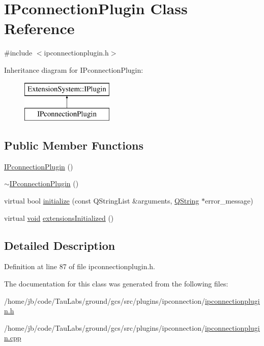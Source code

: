 \hypertarget{class_i_pconnection_plugin}{\section{\-I\-Pconnection\-Plugin \-Class \-Reference}
\label{class_i_pconnection_plugin}
}


{\ttfamily \#include $<$ipconnectionplugin.\-h$>$}

\-Inheritance diagram for \-I\-Pconnection\-Plugin\-:\begin{figure}[H]
\begin{center}
\leavevmode
\includegraphics[height=2.000000cm]{class_i_pconnection_plugin}
\end{center}
\end{figure}
\subsection*{\-Public \-Member \-Functions}
\begin{DoxyCompactItemize}
\item 
\hyperlink{group___i_p_conn_plugin_ga49199ecbe02c9b8fec0c2e0b1003d8ef}{\-I\-Pconnection\-Plugin} ()
\item 
\hyperlink{group___i_p_conn_plugin_gad46085821e644ad2a37cf2b6f79d0883}{$\sim$\-I\-Pconnection\-Plugin} ()
\item 
virtual bool \hyperlink{group___i_p_conn_plugin_ga66ca8127b859071b5c905aa9d0c22c55}{initialize} (const \-Q\-String\-List \&arguments, \hyperlink{group___u_a_v_objects_plugin_gab9d252f49c333c94a72f97ce3105a32d}{\-Q\-String} $\ast$error\-\_\-message)
\item 
virtual \hyperlink{group___u_a_v_objects_plugin_ga444cf2ff3f0ecbe028adce838d373f5c}{void} \hyperlink{group___i_p_conn_plugin_ga61e1d618e2d1914fd8190687cf0017a5}{extensions\-Initialized} ()
\end{DoxyCompactItemize}


\subsection{\-Detailed \-Description}


\-Definition at line 87 of file ipconnectionplugin.\-h.



\-The documentation for this class was generated from the following files\-:\begin{DoxyCompactItemize}
\item 
/home/jb/code/\-Tau\-Labs/ground/gcs/src/plugins/ipconnection/\hyperlink{ipconnectionplugin_8h}{ipconnectionplugin.\-h}\item 
/home/jb/code/\-Tau\-Labs/ground/gcs/src/plugins/ipconnection/\hyperlink{ipconnectionplugin_8cpp}{ipconnectionplugin.\-cpp}\end{DoxyCompactItemize}
